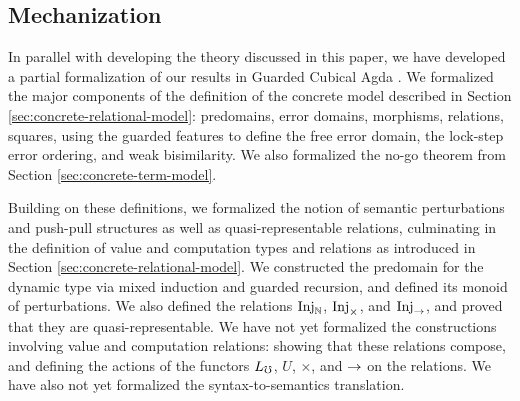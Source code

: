 
\subsection{Mechanization}
In parallel with developing the theory discussed in this paper, we have
developed a partial formalization of our results in Guarded Cubical Agda
\cite{veltri-vezzosi2020}.
%
We formalized the major components of the definition of the concrete model
described in Section \ref{sec:concrete-relational-model}: predomains, error
domains, morphisms, relations, squares, using the guarded
features to define the free error domain, the lock-step error ordering, and weak
bisimilarity. We also formalized the no-go theorem from Section
\ref{sec:concrete-term-model}.

Building on these definitions, we formalized the notion of semantic
perturbations and push-pull structures as well as quasi-representable relations,
culminating in the definition of value and computation types and relations as
introduced in Section \ref{sec:concrete-relational-model}.
%
%
We constructed the predomain for the dynamic type via mixed induction and
guarded recursion, and defined its monoid of perturbations. We also defined the
relations $\text{Inj}_\mathbb{N}$, $\text{Inj}_\times$, and $\text{Inj}_\to$, and proved that they are
quasi-representable.
%
We have not yet formalized the constructions involving value and computation
relations: showing that these relations compose, and defining the actions of the
functors $L_\mho$, $U$, $\times$, and $\to$ on the relations. We have also not yet
formalized the syntax-to-semantics translation.



